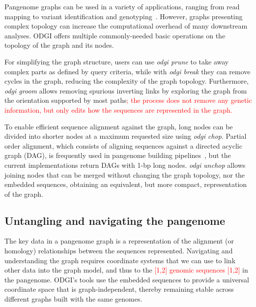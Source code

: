 \documentclass{bioinfo}
\newcommand{\REVIEWED}[1]{{\textcolor{Red}{#1}}}
\begin{document}
Pangenome graphs can be used in a variety of applications, ranging from read mapping to variant identification and genotyping~\citep{Eizenga_2020}.
However, graphs presenting complex topology can increase the computational overhead of many downstream analyses.
ODGI offers multiple commonly-needed basic operations on the topology of the graph and its nodes.

For simplifying the graph structure, users can use \textit{odgi prune} to take away complex parts as defined by query criteria,
while with \textit{odgi break} they can remove cycles in the graph, reducing the complexity of the graph topology.
Furthermore, \textit{odgi groom} allows removing spurious inverting links by exploring the graph from the orientation supported by most paths\REVIEWED{;
the process does not remove any genetic information, but only edits how the sequences are represented in the graph.}

To enable efficient sequence alignment against the graph, long nodes can be divided into shorter nodes at a maximum requested size using \textit{odgi chop}.
Partial order alignment, which consists of aligning sequences against a directed acyclic graph (DAG), is frequently used in pangenome building pipelines~\citep{pggb}, but the current implementations return DAGs with 1-bp long nodes.
\textit{odgi unchop} allows joining nodes that can be merged without changing the graph topology, nor the embedded sequences, obtaining an equivalent, but more compact, representation of the graph.


\subsection{Untangling and navigating the pangenome}
\label{sec:untangle}


The key data in a pangenome graph is a representation of the alignment (or homology) relationships between the sequences represented.
Navigating and understanding the graph requires coordinate systems that we can use to link other data into the graph model, and thus to the \REVIEWED{[1,2] genomic sequences [1,2]} in the pangenome.
ODGI's tools use the embedded sequences to provide a universal coordinate space that is graph-independent, thereby remaining stable across different graphs built with the same genomes.
\end{document}
